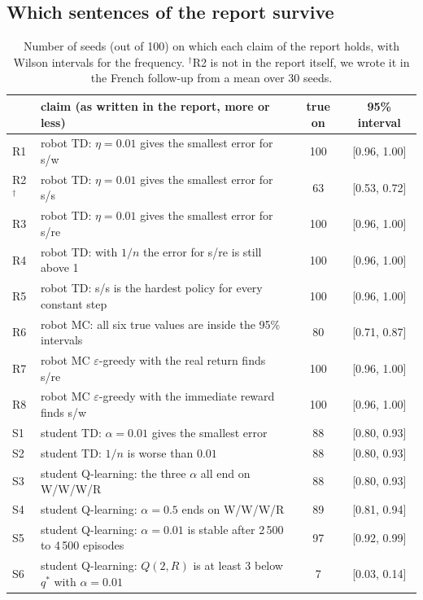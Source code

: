 \subsection{Which sentences of the report survive}

\begin{table}[htbp]
\centering\small
\begin{tabular}{llcc}
\toprule
& claim (as written in the report, more or less) & true on & 95\% interval \\
\midrule
R1 & robot TD: $\eta = 0.01$ gives the smallest error for s/w & 100 & [0.96, 1.00] \\
R2$^\dagger$ & robot TD: $\eta = 0.01$ gives the smallest error for s/s & 63 & [0.53, 0.72] \\
R3 & robot TD: $\eta = 0.01$ gives the smallest error for s/re & 100 & [0.96, 1.00] \\
R4 & robot TD: with $1/n$ the error for s/re is still above 1 & 100 & [0.96, 1.00] \\
R5 & robot TD: s/s is the hardest policy for every constant step & 100 & [0.96, 1.00] \\
R6 & robot MC: all six true values are inside the 95\% intervals & 80 & [0.71, 0.87] \\
R7 & robot MC $\varepsilon$-greedy with the real return finds s/re & 100 & [0.96, 1.00] \\
R8 & robot MC $\varepsilon$-greedy with the immediate reward finds s/w & 100 & [0.96, 1.00] \\
S1 & student TD: $\alpha = 0.01$ gives the smallest error & 88 & [0.80, 0.93] \\
S2 & student TD: $1/n$ is worse than $0.01$ & 88 & [0.80, 0.93] \\
S3 & student Q-learning: the three $\alpha$ all end on W/W/W/R & 88 & [0.80, 0.93] \\
S4 & student Q-learning: $\alpha = 0.5$ ends on W/W/W/R & 89 & [0.81, 0.94] \\
S5 & student Q-learning: $\alpha = 0.01$ is stable after 2\,500 to 4\,500 episodes & 97 & [0.92, 0.99] \\
S6 & student Q-learning: $Q(2, R)$ is at least 3 below $q^*$ with $\alpha = 0.01$ & 7 & [0.03, 0.14] \\
\bottomrule
\end{tabular}
\caption{Number of seeds (out of 100) on which each claim of the report holds, with Wilson intervals for the frequency. $^\dagger$R2 is not in the report itself, we wrote it in the French follow-up from a mean over 30 seeds.}
\label{tab:claims}
\end{table}

